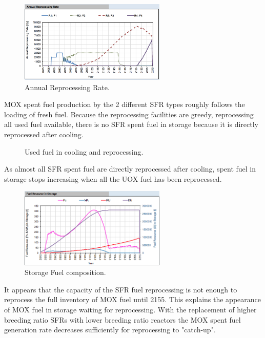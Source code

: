 \documentclass[12pt]{article}
\begin{document}
\begin{figure}[h!]
    \centering
    \includegraphics[width=0.62\textwidth]	{img/AnnualReprocessingRate_1}
    \caption{Annual Reprocessing Rate.}
    \label{fig:reprocessing_1}
\end{figure}


MOX spent fuel production by the 2 different SFR types roughly follows the
loading of fresh fuel.  Because the reprocessing facilities are greedy,
reprocessing all used fuel available, there is no SFR spent fuel in storage
because it is directly reprocessed after cooling.

\begin{figure}[h!]
    \centering
    \caption{Used fuel in cooling and reprocessing.\label{fig:cool_reprocc} }
\end{figure}

As almost all SFR spent fuel are directly reprocessed after cooling, spent
fuel in storage stops increasing when all the UOX fuel has been reprocessed.

\begin{figure}[h!]
    \centering
    \includegraphics[width=0.62\textwidth]{img/FuelInStorage_1}
    \caption{Storage Fuel composition.}
    \label{fig:storagecompo_1}
\end{figure}

It appears that the capacity of the SFR fuel reprocessing is not enough to
reprocess the full inventory of MOX fuel until 2155. This explains the
appearance of MOX fuel in storage waiting for reprocessing. With the
replacement of higher breeding ratio SFRs with lower breeding ratio reactors
the MOX spent fuel generation rate decreases sufficiently for reprocessing to
"catch-up".
\end{document}
